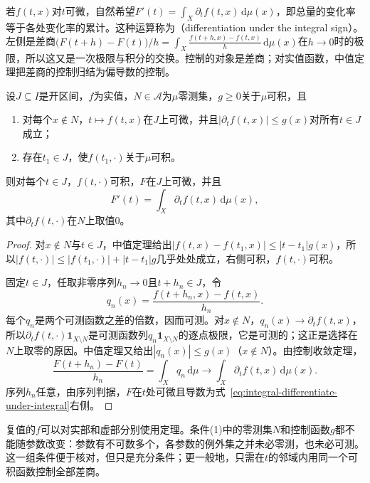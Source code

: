 若$f(t,x)$对$t$可微，自然希望$F'(t)=\int_X\partial_tf(t,x)\,\mathrm d\mu(x)$，即总量的变化率等于各处变化率的累计。这种运算称为（differentiation under the integral sign）。左侧是差商$\bigl(F(t+h)-F(t)\bigr)/h=\int_X\frac{f(t+h,x)-f(t,x)}{h}\,\mathrm d\mu(x)$在$h\to0$时的极限，所以这又是一次极限与积分的交换。控制的对象是差商；对实值函数，中值定理把差商的控制归结为偏导数的控制。

\begin{theorem}[积分号下求导]
\label{thm:integral-differentiate-under-integral}
设$J\subseteq I$是开区间，$f$为实值，$N\in\mathcal A$为$\mu$零测集，$g\ge0$关于$\mu$可积，且
\begin{enumerate}
 \item 对每个$x\notin N$，$t\mapsto f(t,x)$在$J$上可微，并且$|\partial_tf(t,x)|\le g(x)$对所有$t\in J$成立；
 \item 存在$t_1\in J$，使$f(t_1,\cdot)$关于$\mu$可积。
\end{enumerate}
则对每个$t\in J$，$f(t,\cdot)$可积，$F$在$J$上可微，并且
\begin{equation}
 F'(t)=\int_X\partial_tf(t,x)\,\mathrm d\mu(x),
 \label{eq:integral-differentiate-under-integral}
\end{equation}
其中$\partial_tf(t,\cdot)$在$N$上取值$0$。
\end{theorem}

\begin{proof}
对$x\notin N$与$t\in J$，中值定理给出$|f(t,x)-f(t_1,x)|\le|t-t_1|g(x)$，所以$|f(t,\cdot)|\le|f(t_1,\cdot)|+|t-t_1|g$几乎处处成立，右侧可积，$f(t,\cdot)$可积。

固定$t\in J$，任取非零序列$h_n\to0$且$t+h_n\in J$，令
\[
 q_n(x)=\frac{f(t+h_n,x)-f(t,x)}{h_n}.
\]
每个$q_n$是两个可测函数之差的倍数，因而可测。对$x\notin N$，$q_n(x)\to\partial_tf(t,x)$，所以$\partial_tf(t,\cdot)\mathbf 1_{X\setminus N}$是可测函数列$q_n\mathbf 1_{X\setminus N}$的逐点极限，它是可测的；这正是选择在$N$上取零的原因。中值定理又给出$|q_n(x)|\le g(x)$（$x\notin N$）。由控制收敛定理，
\[
 \frac{F(t+h_n)-F(t)}{h_n}=\int_Xq_n\,\mathrm d\mu\longrightarrow\int_X\partial_tf(t,x)\,\mathrm d\mu(x).
\]
序列$h_n$任意，由序列判据，$F$在$t$处可微且导数为式~\eqref{eq:integral-differentiate-under-integral}右侧。
\end{proof}

复值的$f$可以对实部和虚部分别使用定理。条件(1)中的零测集$N$和控制函数$g$都不能随参数改变：参数有不可数多个，各参数的例外集之并未必零测，也未必可测。这一组条件便于核对，但只是充分条件；更一般地，只需在$t$的邻域内用同一个可积函数控制全部差商。

